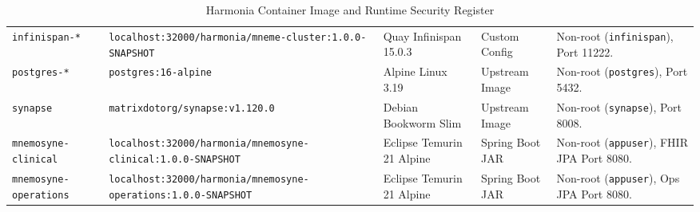\begin{table}[htbp]
\begin{tabularx}{\textwidth}{l P{4.2cm} P{2.5cm} P{2.0cm} Y}
\nolinkurl{infinispan-*} & \nolinkurl{localhost:32000/harmonia/mneme-cluster:1.0.0-SNAPSHOT} & Quay Infinispan 15.0.3 & Custom Config & Non-root (\texttt{infinispan}), Port 11222. \\
\nolinkurl{postgres-*} & \nolinkurl{postgres:16-alpine} & Alpine Linux 3.19 & Upstream Image & Non-root (\texttt{postgres}), Port 5432. \\
\nolinkurl{synapse} & \nolinkurl{matrixdotorg/synapse:v1.120.0} & Debian Bookworm Slim & Upstream Image & Non-root (\texttt{synapse}), Port 8008. \\
\nolinkurl{mnemosyne-clinical} & \nolinkurl{localhost:32000/harmonia/mnemosyne-clinical:1.0.0-SNAPSHOT} & Eclipse Temurin 21 Alpine & Spring Boot JAR & Non-root (\texttt{appuser}), FHIR JPA Port 8080. \\
\nolinkurl{mnemosyne-operations} & \nolinkurl{localhost:32000/harmonia/mnemosyne-operations:1.0.0-SNAPSHOT} & Eclipse Temurin 21 Alpine & Spring Boot JAR & Non-root (\texttt{appuser}), Ops JPA Port 8080. \\
\bottomrule
\end{tabularx}
\caption{Harmonia Container Image and Runtime Security Register}
\label{tab:container_image_register}
\end{table}

\newpage
